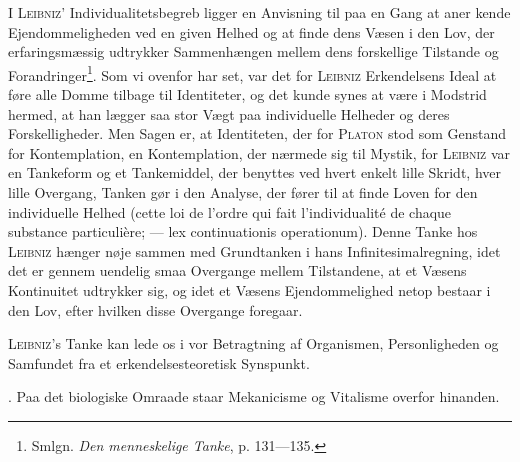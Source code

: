 \documentclass[12pt]{article}
\newcommand{\opage}[1]{\marginnote{\footnotesize\textit{[#1]}}}
\begin{document}
I \textsc{Leibniz}' Individualitetsbegreb ligger en Anvisning til paa en Gang at aner%
\setcounter{footnote}{0}%
\opage{52}kende Ejendommeligheden ved en given Helhed og at finde dens Væsen i den Lov,
der erfaringsmæssig udtrykker Sammenhængen mellem dens forskellige Tilstande
og Forandringer\footnote{Smlgn. \textit{Den menneskelige Tanke}, p. 131---135.}.
Som vi ovenfor har set, var det for \textsc{Leibniz} Erkendelsens Ideal
at føre alle Domme tilbage til Identiteter, og det kunde synes at være i Modstrid
hermed, at han lægger saa stor Vægt paa individuelle Helheder og deres
Forskelligheder. Men Sagen er, at Identiteten, der for \textsc{Platon} stod som Genstand for
Kontemplation, en Kontemplation, der nærmede sig til Mystik, for \textsc{Leibniz} var en
Tankeform og et Tankemiddel, der benyttes ved hvert enkelt lille Skridt, hver lille
Overgang, Tanken gør i den Analyse, der fører til at finde Loven for den individuelle
Helhed (cette loi de l'ordre qui fait l'individualité de chaque substance
particulière; --- lex continuationis operationum). Denne Tanke hos \textsc{Leibniz} hænger nøje
sammen med Grundtanken i hans Infinitesimalregning, idet det er gennem uendelig smaa
Overgange mellem Tilstandene, at et Væsens Kontinuitet udtrykker sig, og idet et Væsens
Ejendommelighed netop bestaar i den Lov, efter hvilken disse Overgange foregaar.

\textsc{Leibniz}'s Tanke kan lede os i vor Betragtning af Organismen, Personligheden
og Samfundet fra et erkendelsesteoretisk Synspunkt.

. Paa det biologiske Omraade staar Mekanicisme og Vitalisme overfor
hinanden.
\end{document}
